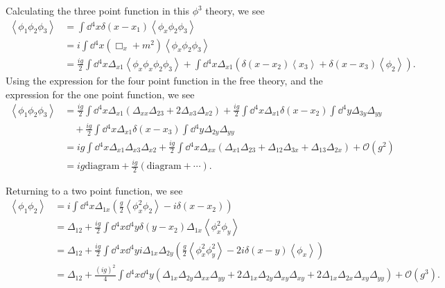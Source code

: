 
\begin{example}
    Calculating the three point function in this $\phi^3$ theory, we see
    \begin{align}
        \left<\phi_1 \phi_2 \phi_3 \right> &= \int \dd{^{4}x} \delta \left( x - x_1 \right) \left< \phi_x \phi_2 \phi_3 \right> \\
        &= i \int \dd{^{4}x} \left( \Box_x + m^2 \right) \left<\phi_x \phi_2 \phi_3 \right> \\
        &= \frac{ig}{2} \int \dd{^{4}x} \Delta_{x 1} \left< \phi_x \phi_x \phi_2 \phi_3 \right> + \int \dd{^{4}x} \Delta_{x 1} \left( \delta \left( x - x_2 \right) \left<x_3 \right> + \delta \left( x - x_3 \right) \left<\phi_2 \right> \right)
      .\end{align}
      Using the expression for the four point function in the free theory, and the expression for the one point function, we see
      \begin{align}
          \left<\phi_1 \phi_2 \phi_3 \right> &= \frac{ig}{2} \int \dd{^{4}x} \Delta_{x 1} \left( \Delta_{x x} \Delta_{23} + 2 \Delta_{x 3} \Delta_{x 2} \right) + \frac{ig}{2} \int \dd{^{4}x} \Delta_{x 1} \delta \left( x - x_2 \right) \int \dd{^{4}y} \Delta_{3y} \Delta_{y y} \nonumber  \\
          &\quad + \frac{ig}{2} \int \dd{^{4}x} \Delta_{x 1} \delta \left( x - x_3 \right) \int \dd{^{4}y} \Delta_{2 y} \Delta_{y y} \\
          &= ig \int \dd{^{4}x} \Delta_{x 1 } \Delta_{x 3} \Delta_{x 2} + \frac{ig}{2} \int \dd{^{4}x} \Delta_{x x} \left(  \Delta_{x 1} \Delta_{2 3} + \Delta_{12} \Delta_{3 x} + \Delta_{1 3} \Delta_{2 x} \right) + \mathcal{O}\left( g^2 \right) \\
          &= ig \text{diagram} + \frac{ig}{2} \left( \text{diagram} + \cdots \right)
      .\end{align}
\end{example}

\begin{example}
    Returning to a two point function, we see
    \begin{align}
        \left<\phi_1 \phi_2 \right> &= i \int \dd{^{4}x} \Delta_{1 x} \left( \frac{g}{2} \left< \phi_x^2 \phi_2 \right> - i \delta \left( x - x_2 \right)  \right)  \\
        &= \Delta_{12} + \frac{ig}{2} \int \dd{^{4}x} \dd{^{4}y} \delta \left( y - x_2 \right)  \Delta_{1x} \left<\phi_x^2 \phi_y \right> \\
        &= \Delta_{12} + \frac{ig}{2} \int \dd{^{4}x} \dd{^{4}y} i \Delta_{1 x} \Delta_{2 y} \left( \frac{g}{2} \left<\phi_x^2 \phi_y^2 \right> - 2i \delta \left(  x - y \right) \left<\phi_x \right>\right)  \\
        &= \Delta_{12} + \frac{\left( ig \right)^2}{4} \int \dd{^{4}x} \dd{^{4}y} \left( \Delta_{1x} \Delta_{2y} \Delta_{x x} \Delta_{y y} + 2 \Delta_{1 x} \Delta_{2 y} \Delta_{x y} \Delta_{x y} + 2\Delta_{1 x} \Delta_{2 x} \Delta_{x y} \Delta_{y y} \right) + \mathcal{O}\left( g^3 \right)
    .\end{align}
    
\end{example}

